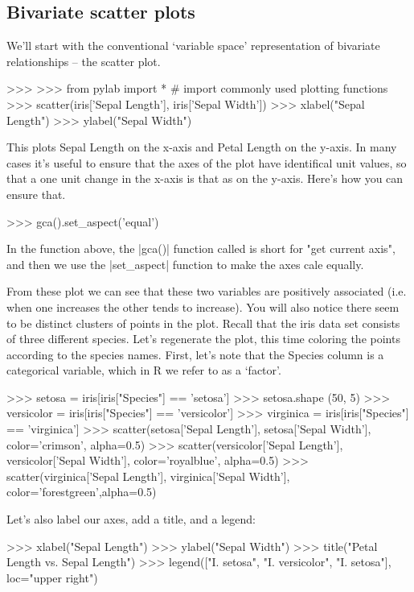\subsection{Bivariate scatter plots}
We'll start with the conventional `variable space' representation of bivariate relationships -- the scatter plot.  
%
\begin{python}
>>> %
>>> from pylab import *  # import commonly used plotting functions
>>> scatter(iris['Sepal Length'], iris['Sepal Width'])
>>> xlabel("Sepal Length")
>>> ylabel("Sepal Width")
\end{python}
%
This plots Sepal Length on the x-axis and Petal Length on the y-axis. In many cases it's useful to ensure that the axes of the plot have identifical unit values, so that a one unit change in the x-axis is that as on the y-axis.  Here's how you can ensure that.
%
\begin{python}
>>> gca().set_aspect('equal')
\end{python}
%
In the function above, the |gca()| function called is short for "get current axis", and then we use the |set_aspect| function to make the axes cale equally.


From these plot we can see that these two variables are positively associated (i.e. when one increases the other tends to increase). You will also notice there seem to be distinct clusters of points in the plot. Recall that the iris data set consists of three different species.  Let's regenerate the plot, this time coloring the points according to the species names.
%
First, let's note that the Species column is a categorical variable, which in R we refer to as a `factor'.
%
\begin{python}
>>> setosa = iris[iris["Species"] == 'setosa']
>>> setosa.shape
(50, 5)
>>> versicolor = iris[iris["Species"] == 'versicolor']
>>> virginica = iris[iris["Species"] == 'virginica']
>>> scatter(setosa['Sepal Length'], setosa['Sepal Width'], color='crimson', alpha=0.5)
>>> scatter(versicolor['Sepal Length'], versicolor['Sepal Width'], color='royalblue', alpha=0.5)
>>> scatter(virginica['Sepal Length'], virginica['Sepal Width'], color='forestgreen',alpha=0.5)
\end{python}
%
Let's also label our axes, add a title, and a legend:
%
\begin{python}
>>> xlabel("Sepal Length")
>>> ylabel("Sepal Width")
>>> title("Petal Length vs. Sepal Length")
>>> legend(["I. setosa", "I. versicolor", "I. setosa"], loc="upper right")
\end{python}



